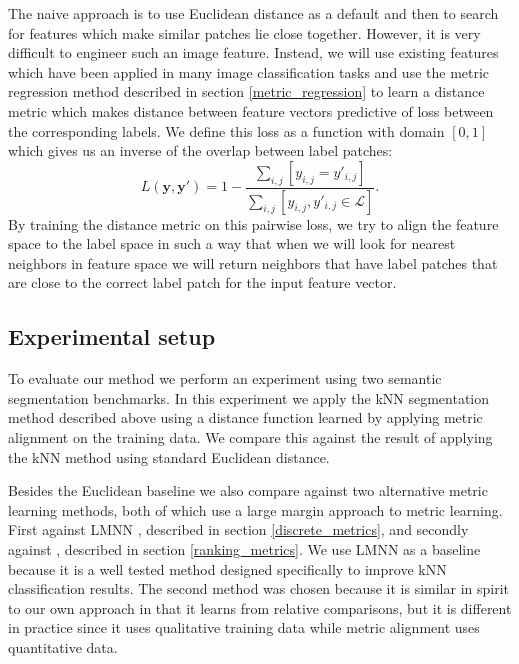 \documentclass[a4paper,titlepage]{article}
\renewcommand{\vec}[1]{\mathbf{#1}}
\begin{document}
The naive approach is to use Euclidean distance as a default and then to search for features which make similar patches lie close together. However, it is very difficult to engineer such an image feature. Instead, we will use existing features which have been applied in many image classification tasks and use the metric regression method described in section \ref{metric_regression} to learn a distance metric which makes distance between feature vectors predictive of loss between the corresponding labels. We define this loss as a function with domain $[0,1]$ which gives us an inverse of the overlap between label patches:
\begin{equation}
L(\vec{y}, \vec{y}\prime) = 1 - \frac{\sum_{i,j} \left [ y_{i,j} = y\prime_{i,j}\right]}{\sum_{i,j} \left [y_{i,j}, y\prime_{i,j} \in \mathcal{L}\right ]}.
\label{eq:patch_loss}
\end{equation}
By training the distance metric on this pairwise loss, we try to align the feature space to the label space in such a way that when we will look for nearest neighbors in feature space we will return neighbors that have label patches that are close to the correct label patch for the input feature vector.




\subsection{Experimental setup}

To evaluate our method we perform an experiment using two semantic segmentation benchmarks. In this experiment we apply the \ac{kNN} segmentation method described above using a distance function learned by applying metric alignment on the training data. We compare this against the result of applying the \ac{kNN} method using standard Euclidean distance.

Besides the Euclidean baseline we also compare against two alternative metric learning methods, both of which use a large margin approach to metric learning. First against \ac{LMNN} \cite{weinberger2009distance}, described in section \ref{discrete_metrics}, and secondly against \cite{schultz2003learning}, described in section \ref{ranking_metrics}. We use \ac{LMNN} as a baseline because it is a well tested method designed specifically to improve \ac{kNN} classification results. The second method was chosen because it is similar in spirit to our own approach in that it learns from relative comparisons, but it is different in practice since it uses qualitative training data while metric alignment uses quantitative data.
\end{document}

